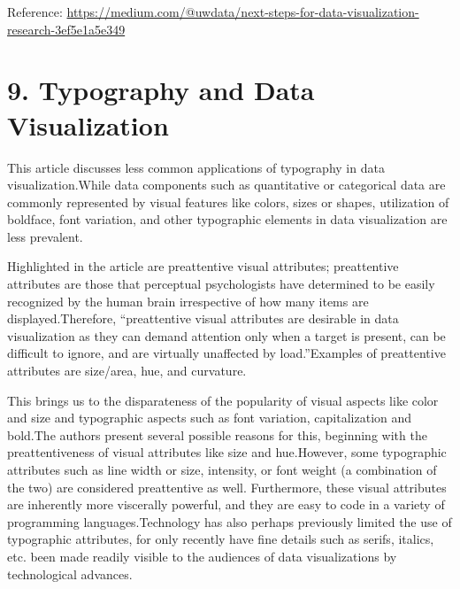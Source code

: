 \documentclass[]{book}
\theoremstyle{definition}
\theoremstyle{definition}
\theoremstyle{definition}
\theoremstyle{remark}
\begin{document}
Reference:
\url{https://medium.com/@uwdata/next-steps-for-data-visualization-research-3ef5e1a5e349}

\section{9. Typography and Data
Visualization}\label{typography-and-data-visualization}

This article discusses less common applications of typography in data
visualization.While data components such as quantitative or categorical
data are commonly represented by visual features like colors, sizes or
shapes, utilization of boldface, font variation, and other typographic
elements in data visualization are less prevalent.

Highlighted in the article are preattentive visual attributes;
preattentive attributes are those that perceptual psychologists have
determined to be easily recognized by the human brain irrespective of
how many items are displayed.Therefore, ``preattentive visual attributes
are desirable in data visualization as they can demand attention only
when a target is present, can be difficult to ignore, and are virtually
unaffected by load.''Examples of preattentive attributes are size/area,
hue, and curvature.

This brings us to the disparateness of the popularity of visual aspects
like color and size and typographic aspects such as font variation,
capitalization and bold.The authors present several possible reasons for
this, beginning with the preattentiveness of visual attributes like size
and hue.However, some typographic attributes such as line width or size,
intensity, or font weight (a combination of the two) are considered
preattentive as well. Furthermore, these visual attributes are
inherently more viscerally powerful, and they are easy to code in a
variety of programming languages.Technology has also perhaps previously
limited the use of typographic attributes, for only recently have fine
details such as serifs, italics, etc. been made readily visible to the
audiences of data visualizations by technological advances.
\end{document}
